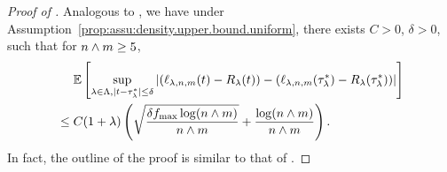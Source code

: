 \begin{proof}[Proof of ]
Analogous to , we have under Assumption~\ref{prop:assu:density.upper.bound.uniform},
there exists $C > 0$, $\delta > 0$, such that for ${n} \wedge m \ge 5$,
    \begin{align*}
        \begin{split}
        &\quad~\mathbb{E}\left[\sup_{\lambda \in \Lambda, |{t} - {\tau^*_\lambda}| \le \delta} \left|
        \left({{\ell}_{\lambda, {n}, m}}({t}) - {R_{\lambda}}{}({t})\right) -
        \left({{\ell}_{\lambda, {n}, m}}({\tau^*_\lambda}) - {R_{\lambda}}{}({\tau^*_\lambda})\right)
        \right|\right] \\
        &\le C (1+\lambda) \left(\sqrt{\frac{\delta {f_{\max}} \log({n} \wedge m)}{{n} \wedge m}} + \frac{\log({n} \wedge m)}{{n} \wedge m}\right).
        \end{split}
    \end{align*}
In fact, the outline of the proof is similar to that of .

\end{proof}
